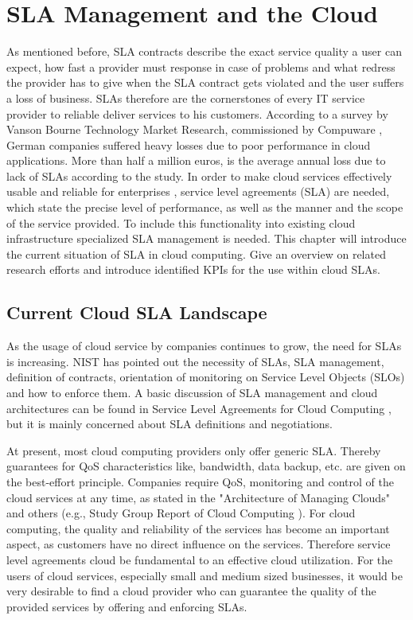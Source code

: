 
\chapter{SLA Management and the Cloud} %

As mentioned before, SLA contracts describe the exact service quality a user can expect, how fast a provider must response in case of problems and what redress the provider has to give when the SLA contract gets violated and the user suffers a loss of business. SLAs therefore are the cornerstones of every IT service provider to reliable deliver services to his customers. According to a survey by Vanson Bourne Technology Market Research, commissioned by Compuware \cite{Bourne}, German companies suffered heavy losses due to poor performance in cloud applications. More than half a million euros, is the average annual loss due to lack of SLAs according to the study. In order to make cloud services effectively usable \cite{IDC} and reliable for enterprises \cite{JTC}, service level agreements (SLA) are needed, which state the precise level of performance, as well as the manner and the scope of the service provided. To include this functionality into existing cloud infrastructure specialized SLA management is needed. This chapter will introduce the current situation of SLA in cloud computing. Give an overview on related research efforts and introduce identified KPIs for the use within cloud SLAs.


\section{Current Cloud SLA Landscape}
As the usage of cloud service by companies continues to grow, the need for SLAs is increasing. NIST  has pointed out the necessity of SLAs, SLA management, definition of contracts, orientation of monitoring on Service Level Objects (SLOs) and how to enforce them. A basic discussion of SLA management and cloud architectures can be found in Service Level Agreements for Cloud Computing \cite{Wieder2011}, but it is mainly concerned about SLA definitions and negotiations.

At present, most cloud computing providers only offer generic SLA. Thereby guarantees for QoS characteristics like, bandwidth, data backup, etc. are given  on the best-effort principle. Companies require QoS, monitoring and control of the cloud services at any time, as stated in the "Architecture of Managing Clouds" \cite{DMTF2010} and others (e.g., Study Group Report of Cloud Computing \cite{SC38StudyGroup2011}). For cloud computing, the quality and reliability of the services has become an important aspect, as customers have no direct influence on the services. Therefore service level agreements cloud be fundamental to an effective cloud utilization. For the users of cloud services, especially small and medium sized businesses, it would be very desirable to find a cloud provider who can guarantee the quality of the provided services by offering and enforcing SLAs.

